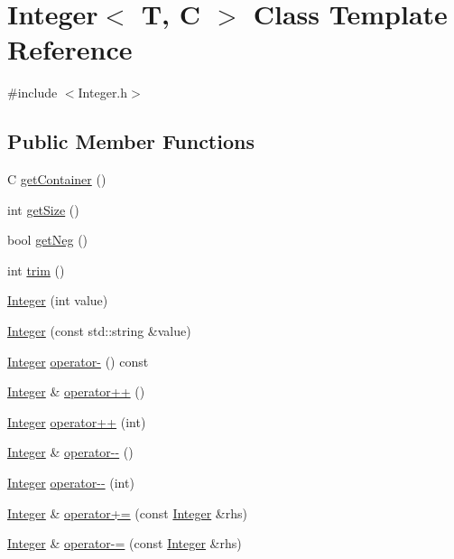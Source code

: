 \hypertarget{classInteger}{\section{Integer$<$ T, C $>$ Class Template Reference}
\label{classInteger}
}


{\ttfamily \#include $<$Integer.\-h$>$}

\subsection*{Public Member Functions}
\begin{DoxyCompactItemize}
\item 
C \hyperlink{classInteger_a8a8bf40274adf7539a559899c450ec12}{get\-Container} ()
\item 
int \hyperlink{classInteger_a78c187ec300da7cccca2cd5d69104558}{get\-Size} ()
\item 
bool \hyperlink{classInteger_a81149d478d8f924bcbf0df63ffdcf467}{get\-Neg} ()
\item 
int \hyperlink{classInteger_a4494cc80a0cb7b8ad8652d003a39db7d}{trim} ()
\item 
\hyperlink{classInteger_a1d5315e4ec5b56b8cb3a6991d514f7d6}{Integer} (int value)
\item 
\hyperlink{classInteger_afebf72d47413ceedcc30b74c3055b771}{Integer} (const std\-::string \&value)
\item 
\hyperlink{classInteger}{Integer} \hyperlink{classInteger_ae9d1fb575b55ac2f6352a2d735c4bb75}{operator-\/} () const 
\item 
\hyperlink{classInteger}{Integer} \& \hyperlink{classInteger_a3fc47ae07dce44aa72ce9e02b9a3e003}{operator++} ()
\item 
\hyperlink{classInteger}{Integer} \hyperlink{classInteger_a326d5bd7d72ad858f523bed95ae66150}{operator++} (int)
\item 
\hyperlink{classInteger}{Integer} \& \hyperlink{classInteger_ac6227ea2b4a75ff08d537db0d3a26be4}{operator-\/-\/} ()
\item 
\hyperlink{classInteger}{Integer} \hyperlink{classInteger_ae5b697679221dbf1fbc942335bb19fb4}{operator-\/-\/} (int)
\item 
\hyperlink{classInteger}{Integer} \& \hyperlink{classInteger_a0c37e366a26b17cfd73b1b29a1e8b47b}{operator+=} (const \hyperlink{classInteger}{Integer} \&rhs)
\item 
\hyperlink{classInteger}{Integer} \& \hyperlink{classInteger_a2bff1e6dc8f6990028783da8bdd89b0d}{operator-\/=} (const \hyperlink{classInteger}{Integer} \&rhs)

\end{DoxyCompactItemize}
